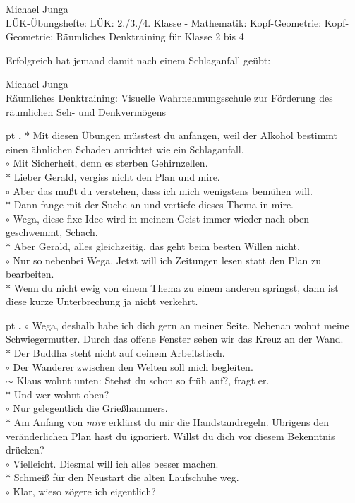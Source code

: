 \documentclass[10pt,a4paper]{article}
\newcounter{notec}
\newcommand\notep[1]{%
  \stepcounter{notec}
  \vskip #1pt
  {\bf\arabic{notec}.}
}
\begin{document}
\begin{mdframed}[style=daystyle]
  \vskip 2pt
  Michael Junga \\
  LÜK-Übungshefte: LÜK: 2./3./4. Klasse - Mathematik: Kopf-Geometrie:
  Kopf-Geometrie: Räumliches Denktraining für Klasse 2 bis 4

  \vskip 2pt
  Erfolgreich hat jemand damit nach einem Schlaganfall geübt:

  \vskip 2pt
  Michael Junga \\
  Räumliches Denktraining: Visuelle Wahrnehmungsschule zur Förderung des
  räumlichen Seh- und Denkvermögens

  \notep 4 $\ast$ Mit diesen Übungen müsstest du anfangen, weil der Alkohol
  bestimmt einen ähnlichen Schaden anrichtet wie ein Schlaganfall. \\
  $\circ$ Mit Sicherheit, denn es sterben Gehirnzellen. \\
  $\ast$ Lieber Gerald, vergiss nicht den Plan und mire. \\
  $\circ$ Aber das mußt du verstehen, dass ich mich wenigstens bemühen will. \\
  $\ast$ Dann fange mit der Suche an und vertiefe dieses Thema in mire. \\
  $\circ$ Wega, diese fixe Idee wird in meinem Geist immer wieder nach oben geschwemmt, Schach. \\
  $\ast$ Aber Gerald, alles gleichzeitig, das geht beim besten Willen nicht. \\
  $\circ$ Nur so nebenbei Wega. Jetzt will ich Zeitungen lesen statt den Plan zu bearbeiten. \\
  $\ast$ Wenn du nicht ewig von einem Thema zu einem anderen springst, dann ist
  diese kurze Unterbrechung ja nicht verkehrt.

  \notep 4 $\circ$ Wega, deshalb habe ich dich gern an meiner Seite. Nebenan
  wohnt meine Schwiegermutter. Durch das offene Fenster sehen wir das Kreuz an
  der Wand. \\
  $\ast$ Der Buddha steht nicht auf deinem Arbeitstisch. \\
  $\circ$ Der Wanderer zwischen den Welten soll mich begleiten. \\
  $\sim$ Klaus wohnt unten: Stehst du schon so früh auf?, fragt er. \\
  $\ast$ Und wer wohnt oben? \\
  $\circ$ Nur gelegentlich die Grießhammers. \\
  $\ast$ Am Anfang von {\it mire} erklärst du mir die Handstandregeln. Übrigens
  den veränderlichen Plan hast du ignoriert. Willst du dich vor diesem
  Bekenntnis drücken? \\
  $\circ$ Vielleicht. Diesmal will ich alles besser machen. \\
  $\ast$ Schmeiß für den Neustart die alten Laufschuhe weg. \\
  $\circ$ Klar, wieso zögere ich eigentlich?


\end{mdframed}
\end{document}
